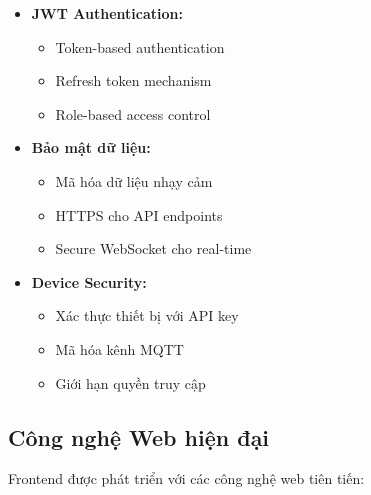\begin{itemize}
    \item \textbf{JWT Authentication:}
    \begin{itemize}
        \item Token-based authentication
        \item Refresh token mechanism
        \item Role-based access control
    \end{itemize}
    
    \item \textbf{Bảo mật dữ liệu:}
    \begin{itemize}
        \item Mã hóa dữ liệu nhạy cảm
        \item HTTPS cho API endpoints
        \item Secure WebSocket cho real-time
    \end{itemize}
    
    \item \textbf{Device Security:}
    \begin{itemize}
        \item Xác thực thiết bị với API key
        \item Mã hóa kênh MQTT
        \item Giới hạn quyền truy cập
    \end{itemize}
\end{itemize}

\subsection{Công nghệ Web hiện đại}
\hspace{0.5cm}Frontend được phát triển với các công nghệ web tiên tiến:

